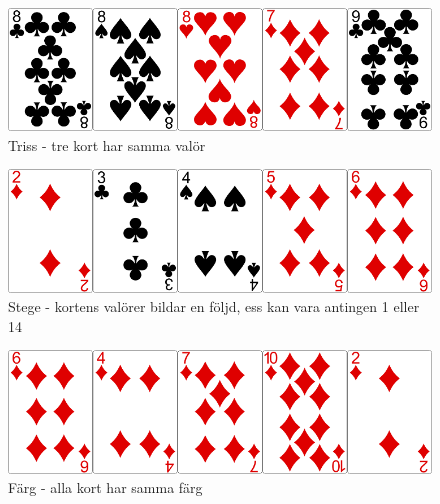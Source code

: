 \begin{figure}[H]
 \begin{minipage}[c]{0.5\textwidth}
  \includegraphics[width=\textwidth]{../img/w05-hands/trips.png}
 \end{minipage}
 \begin{minipage}[c]{0.3\textwidth}
  \caption{Triss - tre kort har samma valör}
 \end{minipage}
\end{figure}

\begin{figure}[H]
 \begin{minipage}[c]{0.5\textwidth}
  \includegraphics[width=\textwidth]{../img/w05-hands/straight.png}
 \end{minipage}
 \begin{minipage}[c]{0.3\textwidth}
  \caption{Stege - kortens valörer bildar en följd, ess kan vara antingen 1 eller 14}
 \end{minipage}
\end{figure}

\begin{figure}[H]
 \begin{minipage}[c]{0.5\textwidth}
  \includegraphics[width=\textwidth]{../img/w05-hands/flush.png}
 \end{minipage}
 \begin{minipage}[c]{0.3\textwidth}
  \caption{Färg - alla kort har samma färg}
 \end{minipage}
\end{figure}

